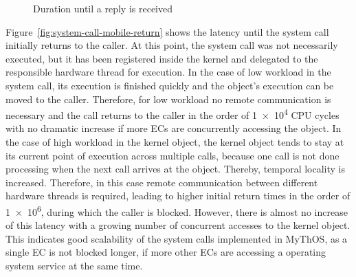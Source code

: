 \begin{figure}[ht!]
  \begin{center}
    \caption{Duration until a reply is received}
    \label{fig:system-call-mobile-reply}
  \end{center}
\end{figure}

Figure~\ref{fig:system-call-mobile-return} shows the latency until the system call initially returns to the caller. At this point, the system call was not necessarily executed, but it has been registered inside the kernel and delegated to the responsible hardware thread for execution. In the case of low workload in the system call, its execution is finished quickly and the object's execution can be moved to the caller. Therefore, for low workload no remote communication is necessary and the call returns to the caller in the order of \num{1e4} CPU cycles with no dramatic increase if more ECs are concurrently accessing the object.
In the case of high workload in the kernel object, the kernel object tends to stay at its current point of execution across multiple calls, because one call is not done processing when the next call arrives at the object. Thereby, temporal locality is increased. Therefore, in this case remote communication between different hardware threads is required, leading to higher initial return times in the order of \num{1e6}, during which the caller is blocked. However, there is almost no increase of this latency with a growing number of concurrent accesses to the kernel object. This indicates good scalability of the system calls implemented in MyThOS, as a single EC is not blocked longer, if more other ECs are accessing a operating system service at the same time.

